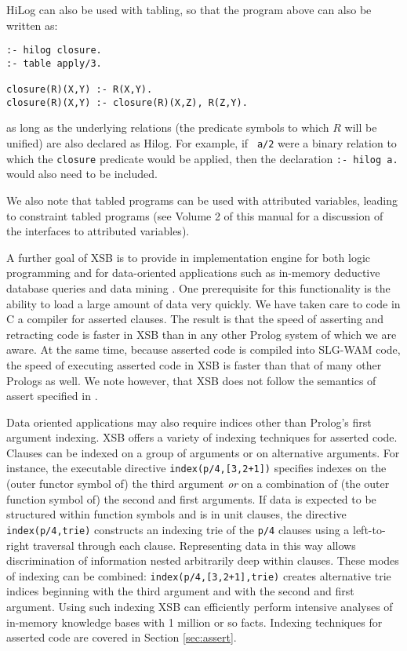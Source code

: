 HiLog can also be used with tabling, so that the program above can also be
written as:
\begin{center}
\begin{minipage}{3.7in}
\begin{verbatim}
:- hilog closure.
:- table apply/3.

closure(R)(X,Y) :- R(X,Y).
closure(R)(X,Y) :- closure(R)(X,Z), R(Z,Y).
\end{verbatim}
\end{minipage}
\end{center}
as long as the underlying relations (the predicate symbols to which
$R$ will be unified) are also declared as Hilog.  For example, if {\tt
a/2} were a binary relation to which the {\tt closure} predicate would
be applied, then the declaration {\tt :- hilog a.} would also need to
be included.

We also note that tabled programs can be used with attributed
variables, leading to constraint tabled programs (see Volume 2 of this
manual for a discussion of the interfaces to attributed variables).

A further goal of XSB is to provide in implementation engine for both
logic programming and for data-oriented applications such as in-memory
deductive database queries and data mining \cite{SaSw94}.  One
prerequisite for this functionality is the ability to load a large
amount of data very quickly.  We have taken care to code in C a
compiler for asserted clauses.  The result is that the speed of
asserting and retracting code is faster in XSB than in any other
Prolog system of which we are aware.  At the same time, because
asserted code is compiled into SLG-WAM code, the speed of executing
asserted code in XSB is faster than that of many other Prologs as
well.  We note however, that XSB does not follow the semantics of
assert specified in \cite{LiOk87}.

Data oriented applications may also require indices other than
Prolog's first argument indexing.  XSB offers a variety of indexing
techniques for asserted code.  Clauses can be indexed on a group of
arguments or on alternative arguments.  For instance, the executable
directive {\tt index(p/4,[3,2+1])} specifies indexes on the (outer
functor symbol of) the third argument {\em or} on a combination of
(the outer function symbol of) the second and first arguments.  If
data is expected to be structured within function symbols and is in
unit clauses, the directive {\tt index(p/4,trie)} constructs an
indexing trie of the {\tt p/4} clauses using a left-to-right traversal
through each clause.  Representing data in this way allows
discrimination of information nested arbitrarily deep within clauses.
These modes of indexing can be combined: {\tt index(p/4,[3,2+1],trie)}
creates alternative trie indices beginning with the third argument and
with the second and first argument.  Using such indexing XSB can
efficiently perform intensive analyses of in-memory knowledge bases
with 1 million or so facts.  Indexing techniques for asserted code are
covered in Section \ref{sec:assert}.

